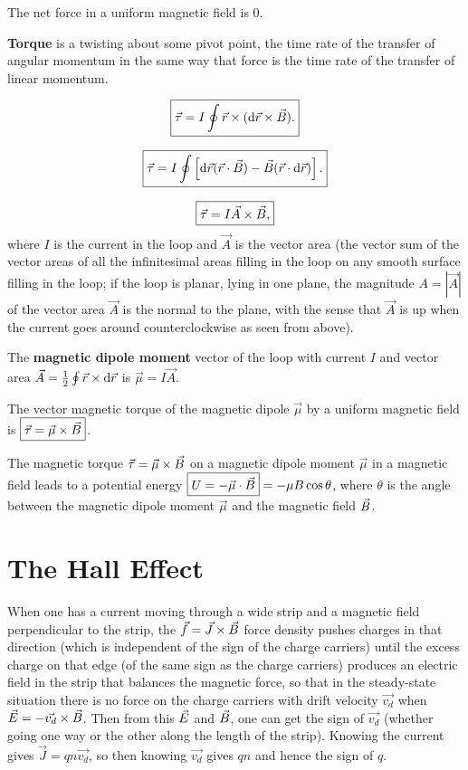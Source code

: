 The net force in a uniform magnetic field is 0.

\textbf{Torque} is a twisting about some pivot point, the time rate of the transfer of angular momentum in the same way that force is the time rate of the transfer of linear momentum. 

\begin{equation}
\boxed{ \vec{\tau} = I \oint \vec{r} \times (\operatorname{d\!} \vec{r} \times \vec{B}). }
\end{equation}

\begin{equation}
\boxed{ \vec{\tau} = I \oint \left[  \operatorname{d\!} \vec{r}(\vec{r}\cdot\vec{B}) - \vec{B}(\vec{r}\cdot\operatorname{d\!}\vec{r})  \right]. }
\end{equation}

\begin{equation}
\boxed{ \vec{\tau} = I\vec{A}\times\vec{B}, }
\end{equation}
where $I$ is the current in the loop and $\vec{A}$ is the vector area (the vector sum of the vector areas of all the infinitesimal areas filling in the loop on any smooth surface filling in the loop; if the loop is planar, lying in one plane, the magnitude $A = |\vec{A}|$ of the vector area $\vec{A}$ is the normal to the plane, with the sense that $\vec{A}$ is up when the current goes around counterclockwise as seen from above).

The \textbf{magnetic dipole moment} vector of the loop with current $I$ and vector area $\vec{A} = \frac{1}{2} \oint \vec{r} \times \operatorname{d\!} \vec{r}$ is $\boxed{\vec{\mu} = I\vec{A}}$.

The vector magnetic torque of the magnetic dipole $\vec{\mu}$ by a uniform magnetic field is $\boxed{\vec{\tau} = \vec{\mu} \times \vec{B}}$.

The magnetic torque $\vec{\tau} = \vec{\mu} \times \vec{B}$ on a magnetic dipole moment $\vec{\mu}$ in a magnetic field leads to a potential energy $\boxed{U = -\vec{\mu} \cdot \vec{B}} = -\mu B\cos\theta$, where $\theta$ is the angle between the magnetic dipole moment $\vec{\mu}$ and the magnetic field $\vec{B}$.

\section{The Hall Effect}

When one has a current moving through a wide strip and a magnetic field perpendicular to the strip, the $\vec{f} = \vec{J} \times \vec{B}$ force density pushes charges in that direction (which is independent of the sign of the charge carriers) until the excess charge on that edge (of the same sign as the charge carriers) produces an electric field in the strip that balances the magnetic force, so that in the steady-state situation there is no force on the charge carriers with drift velocity $\vec{v_d}$ when $\vec{E} = -\vec{v_d}\times\vec{B}$. Then from this $\vec{E}$ and $\vec{B}$, one can get the sign of $\vec{v_d}$ (whether going one way or the other along the length of the strip). Knowing the current gives $\vec{J} = qn\vec{v_d}$, so then knowing $\vec{v_d}$ gives $qn$ and hence the sign of $q$.
